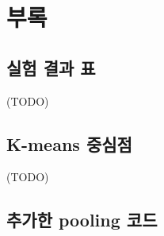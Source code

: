 \documentclass[a4paper,9pt]{article}
\begin{document}
\section*{부록}

\subsection*{실험 결과 표}

(TODO)

\subsection*{K-means 중심점}

(TODO)

\subsection*{추가한 pooling 코드}
\end{document}
